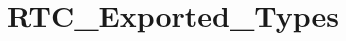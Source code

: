 \hypertarget{group__RTC__Exported__Types}{
\section{RTC\_\-Exported\_\-Types}
\label{group__RTC__Exported__Types}
}
